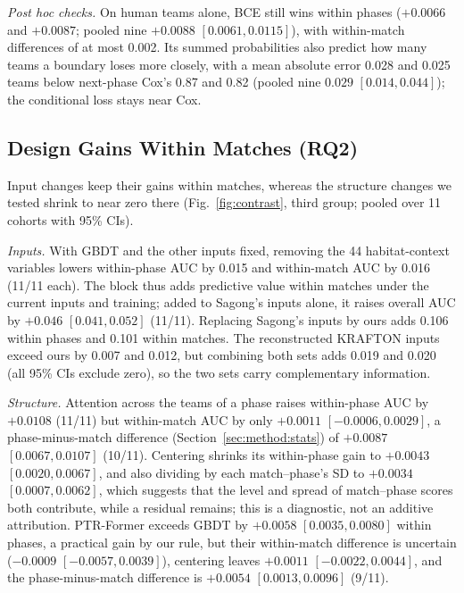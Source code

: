 \documentclass[sigconf,anonymous]{acmart}
\begin{document}
\emph{Post hoc checks.} On human teams alone, BCE still wins within phases ($+0.0066$ and $+0.0087$; pooled nine $+0.0088$ $[0.0061,\allowbreak 0.0115]$), with within-match differences of at most 0.002. Its summed probabilities also predict how many teams a boundary loses more closely, with a mean absolute error 0.028 and 0.025 teams below next-phase Cox's 0.87 and 0.82 (pooled nine $0.029$ $[0.014,\allowbreak 0.044]$); the conditional loss stays near Cox.

\subsection{Design Gains Within Matches (RQ2)}
\label{sec:results:inputs}
Input changes keep their gains within matches, whereas the structure changes we tested shrink to near zero there (Fig.~\ref{fig:contrast}, third group; pooled over 11 cohorts with 95\% CIs).

\emph{Inputs.} With GBDT and the other inputs fixed, removing the 44 habitat-context variables lowers within-phase AUC by 0.015 and within-match AUC by 0.016 (11/11 each). The block thus adds predictive value within matches under the current inputs and training; added to Sagong's inputs alone, it raises overall AUC by $+0.046$ $[0.041,\allowbreak 0.052]$ (11/11). Replacing Sagong's inputs by ours adds 0.106 within phases and 0.101 within matches. The reconstructed KRAFTON inputs exceed ours by 0.007 and 0.012, but combining both sets adds 0.019 and 0.020 (all 95\% CIs exclude zero), so the two sets carry complementary information.

\emph{Structure.} Attention across the teams of a phase raises within-phase AUC by $+0.0108$ (11/11) but within-match AUC by only $+0.0011$ $[-0.0006,\allowbreak 0.0029]$, a phase-minus-match difference (Section~\ref{sec:method:stats}) of $+0.0087$ $[0.0067,\allowbreak 0.0107]$ (10/11). Centering shrinks its within-phase gain to $+0.0043$ $[0.0020,\allowbreak 0.0067]$, and also dividing by each match--phase's SD to $+0.0034$ $[0.0007,\allowbreak 0.0062]$, which suggests that the level and spread of match--phase scores both contribute, while a residual remains; this is a diagnostic, not an additive attribution. PTR-Former exceeds GBDT by $+0.0058$ $[0.0035,\allowbreak 0.0080]$ within phases, a practical gain by our rule, but their within-match difference is uncertain ($-0.0009$ $[-0.0057,\allowbreak 0.0039]$), centering leaves $+0.0011$ $[-0.0022,\allowbreak 0.0044]$, and the phase-minus-match difference is $+0.0054$ $[0.0013,\allowbreak 0.0096]$ (9/11).
\end{document}
